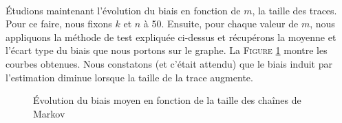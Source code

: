 \documentclass[a4paper,titlepage]{report}
\begin{document}
\paragraph{} Étudions maintenant l'évolution du biais en fonction de $m$, la taille des traces. Pour ce faire, nous fixons $k$ et $n$ à 50. Ensuite, pour chaque valeur de $m$, nous appliquons la méthode de test expliquée ci-dessus et récupérons la moyenne et l'écart type du biais que nous portons sur le graphe. La \textsc{Figure} \ref{fig:evol_m_bias} montre les courbes obtenues. Nous constatons (et c'était attendu) que le biais induit par l'estimation diminue lorsque la taille de la trace augmente.
\begin{figure}[h]
	\center
	\caption{Évolution du biais moyen en fonction de la taille des chaînes de Markov}
	\label{fig:evol_m_bias}
\end{figure}
\end{document}
